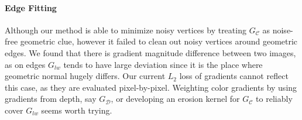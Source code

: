 \paragraph{Edge Fitting}
Although our method is able to minimize noisy vertices by treating $G_\mathcal{C}$ as noise-free geometric clue, however it failed to clean out noisy vertices around geometric edges. 
We found that there is gradient magnitude difference between two images, as on edges $G_{lw}$ tends to have large deviation since it is the place where geometric normal hugely differs. 
Our current $L_2$ loss of gradients cannot reflect this case, as they are evaluated pixel-by-pixel. 
Weighting color gradients by using gradients from depth, say $G_\mathcal{D}$, or developing an erosion kernel for $G_\mathcal{C}$ to reliably cover $G_{lw}$ seems worth trying.

